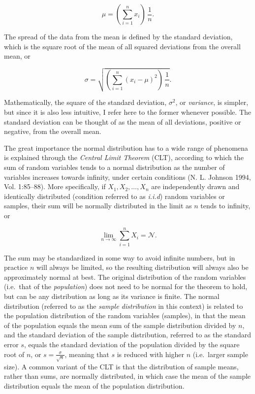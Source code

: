 \documentclass[
  12pt,
  a4paper, twoside]{book}
\begin{document}
\begin{equation}
\mu = (\sum_{i=1}^nx_i)\,\frac{1}{n}.
\label{eq:mu}
\end{equation}

The spread of the data from the mean is defined by the standard deviation, which is the square root of the mean of all squared deviations from the overall mean, or

\begin{equation}
\sigma = \sqrt{(\sum_{i=1}^n(x_i-\mu)^2)\,\frac{1}{n}}.
\label{eq:sigma}
\end{equation}

Mathematically, the square of the standard deviation, \(\sigma^2\), or \emph{variance}, is simpler, but since it is also less intuitive, I refer here to the former whenever possible. The standard deviation can be thought of as the mean of all deviations, positive or negative, from the overall mean.

The great importance the normal distribution has to a wide range of phenomena is explained through the \emph{Central Limit Theorem} (CLT), according to which the sum of random variables tends to a normal distribution as the number of variables increases towards infinity, under certain conditions (N. L. Johnson 1994, Vol. 1:85--88). More specifically, if \(X_1, X_2, \dots, X_n\) are independently drawn and identically distributed (condition referred to as \emph{i.i.d}) random variables or samples, their sum will be normally distributed in the limit as \(n\) tends to infinity, or

\begin{equation}
\lim\limits_{n \to \infty} \sum_{i=1}^n X_i = \mathcal{N}.
\label{eq:CLT}
\end{equation}

The sum may be standardized in some way to avoid infinite numbers, but in practice \(n\) will always be limited, so the resulting distribution will always also be approximately normal at best. The original distribution of the random variables (i.e.~that of the \emph{population}) does not need to be normal for the theorem to hold, but can be any distribution as long as its variance is finite. The normal distribution (referred to as the \emph{sample distribution} in this context) is related to the population distribution of the random variables (samples), in that the mean of the population equals the mean sum of the sample distribution divided by \(n\), and the standard deviation of the sample distribution, referred to as the standard error \(s\), equals the standard deviation of the population divided by the square root of \(n\), or \(s = \frac{\sigma}{\sqrt{n}}\), meaning that \(s\) is reduced with higher \(n\) (i.e.~larger sample size). A common variant of the CLT is that the distribution of sample means, rather than sums, are normally distributed, in which case the mean of the sample distribution equals the mean of the population distribution.
\end{document}

